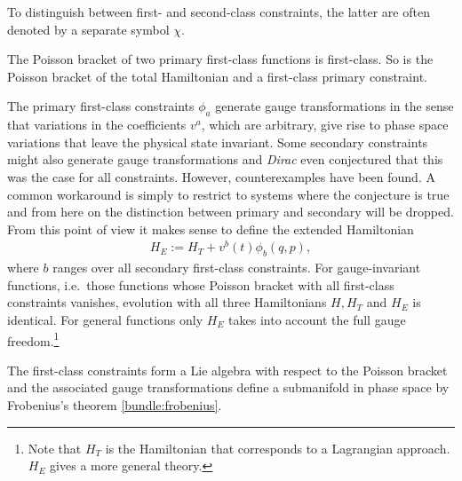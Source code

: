     \begin{notation}
        To distinguish between first- and second-class constraints, the latter are often denoted by a separate symbol $\chi$.
    \end{notation}
    \begin{property}[Closure]
        The Poisson bracket of two primary first-class functions is first-class. So is the Poisson bracket of the total Hamiltonian and a first-class primary constraint.
    \end{property}

    \begin{remark}
        The primary first-class constraints $\phi_a$ generate gauge transformations in the sense that variations in the coefficients $v^a$, which are arbitrary, give rise to phase space variations that leave the physical state invariant. Some secondary constraints might also generate gauge transformations and \textit{Dirac} even conjectured that this was the case for all constraints. However, counterexamples have been found. A common workaround is simply to restrict to systems where the conjecture is true and from here on the distinction between primary and secondary will be dropped. From this point of view it makes sense to define the extended Hamiltonian
        \begin{gather}
            H_E := H_T + v^b(t)\phi_b(q,p),
        \end{gather}
        where $b$ ranges over all secondary first-class constraints. For gauge-invariant functions, i.e.~those functions whose Poisson bracket with all first-class constraints vanishes, evolution with all three Hamiltonians $H,H_T$ and $H_E$ is identical. For general functions only $H_E$ takes into account the full gauge freedom.\footnote{Note that $H_T$ is the Hamiltonian that corresponds to a Lagrangian approach. $H_E$ gives a more general theory.}
    \end{remark}
    \begin{result}
        The first-class constraints form a Lie algebra with respect to the Poisson bracket and the associated gauge transformations define a submanifold in phase space by Frobenius's theorem \ref{bundle:frobenius}.
    \end{result}

